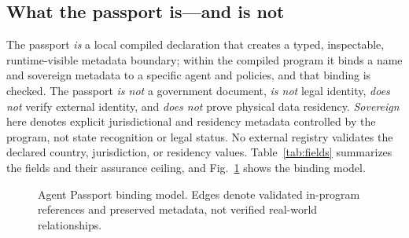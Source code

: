 \documentclass[conference]{IEEEtran}
\newcommand{\code}[1]{\texttt{\small #1}}
\begin{document}
\subsection{What the passport is---and is not}
The passport \emph{is} a local compiled declaration that creates a typed,
inspectable, runtime-visible metadata boundary; within the compiled program it
binds a name and sovereign metadata to a specific agent and policies, and that
binding is checked. The passport \emph{is not} a government document, \emph{is
not} legal identity, \emph{does not} verify external identity, and \emph{does
not} prove physical data residency. \emph{Sovereign} here denotes explicit
jurisdictional and residency metadata controlled by the program, not state
recognition or legal status. No external registry validates the declared
country, jurisdiction, or residency values. Table~\ref{tab:fields} summarizes the
fields and their assurance ceiling, and Fig.~\ref{fig:binding} shows the binding
model.

\begin{figure}[t]
\centering
{}
\caption{Agent Passport binding model. Edges denote validated in-program
references and preserved metadata, not verified real-world relationships.}
\label{fig:binding}
\end{figure}
\end{document}
